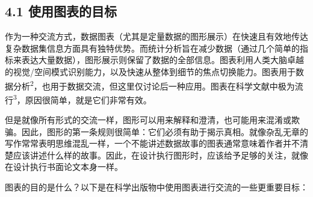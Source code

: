 \subsection*{4.1 使用图表的目标}
作为一种交流方式，数据图表（尤其是定量数据的图形展示）在快速且有效地传达复杂数据集信息方面具有独特优势。而统计分析旨在减少数据（通过几个简单的指标来表达大量数据），图形展示则保留了数据的全部信息。图表利用人类大脑卓越的视觉/空间模式识别能力，以及快速从整体到细节的焦点切换能力。图表用于数据分析\textsuperscript{2}，也用于数据交流，但这里仅讨论后一种应用。图表在科学文献中极为流行\textsuperscript{3}，原因很简单，就是它们非常有效。

但是就像所有形式的交流一样，图形可以用来解释和澄清，也可能用来混淆或欺骗。因此，图形的第一条规则很简单：它们必须有助于揭示真相。就像杂乱无章的写作常常表明思维混乱一样，一个不能讲述数据故事的图表通常意味着作者并不清楚应该讲述什么样的故事。因此，在设计执行图形时，应该给予足够的关注，就像在设计执行书面论文本身一样。

图表的目的是什么？以下是在科学出版物中使用图表进行交流的一些更重要目标：

